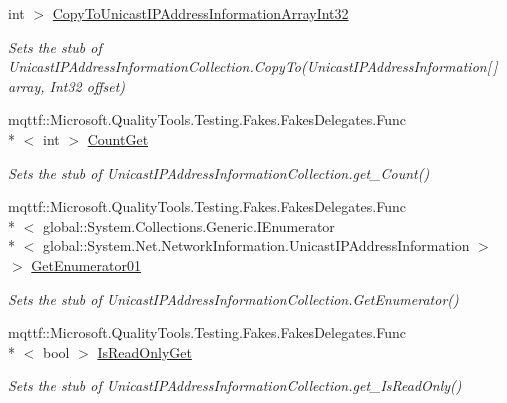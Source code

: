 \begin{DoxyCompactItemize}
int $>$ \hyperlink{class_system_1_1_net_1_1_network_information_1_1_fakes_1_1_stub_unicast_i_p_address_information_collection_ad3c47f5c2667e72d42660f6855401dac}{Copy\-To\-Unicast\-I\-P\-Address\-Information\-Array\-Int32}
\begin{DoxyCompactList}\small\item\em Sets the stub of Unicast\-I\-P\-Address\-Information\-Collection.\-Copy\-To(\-Unicast\-I\-P\-Address\-Information\mbox{[}$\,$\mbox{]} array, Int32 offset)\end{DoxyCompactList}\item 
mqttf\-::\-Microsoft.\-Quality\-Tools.\-Testing.\-Fakes.\-Fakes\-Delegates.\-Func\\*
$<$ int $>$ \hyperlink{class_system_1_1_net_1_1_network_information_1_1_fakes_1_1_stub_unicast_i_p_address_information_collection_aa7cb2471314513c3e7b77ffbd1342b04}{Count\-Get}
\begin{DoxyCompactList}\small\item\em Sets the stub of Unicast\-I\-P\-Address\-Information\-Collection.\-get\-\_\-\-Count()\end{DoxyCompactList}\item 
mqttf\-::\-Microsoft.\-Quality\-Tools.\-Testing.\-Fakes.\-Fakes\-Delegates.\-Func\\*
$<$ global\-::\-System.\-Collections.\-Generic.\-I\-Enumerator\\*
$<$ global\-::\-System.\-Net.\-Network\-Information.\-Unicast\-I\-P\-Address\-Information $>$ $>$ \hyperlink{class_system_1_1_net_1_1_network_information_1_1_fakes_1_1_stub_unicast_i_p_address_information_collection_a12fc294ea8da1c53e81b4e8847047a49}{Get\-Enumerator01}
\begin{DoxyCompactList}\small\item\em Sets the stub of Unicast\-I\-P\-Address\-Information\-Collection.\-Get\-Enumerator()\end{DoxyCompactList}\item 
mqttf\-::\-Microsoft.\-Quality\-Tools.\-Testing.\-Fakes.\-Fakes\-Delegates.\-Func\\*
$<$ bool $>$ \hyperlink{class_system_1_1_net_1_1_network_information_1_1_fakes_1_1_stub_unicast_i_p_address_information_collection_aac42c2d624f407ba9fb304ca6a2c5454}{Is\-Read\-Only\-Get}
\begin{DoxyCompactList}\small\item\em Sets the stub of Unicast\-I\-P\-Address\-Information\-Collection.\-get\-\_\-\-Is\-Read\-Only()\end{DoxyCompactList}\item 

\end{DoxyCompactItemize}
